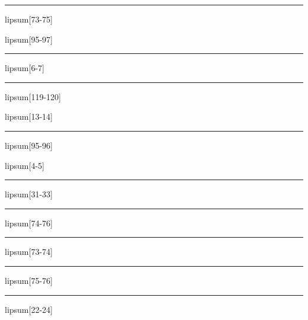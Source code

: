\documentclass[11pt,a4paper]{article}
\begin{document}
\begin{simplewrap}
  \textcolor{purple!26}{\rule{3.5cm}{6.7cm}}
\end{simplewrap}
lipsum[73-75]

lipsum[95-97]

\begin{simplewrap}
  \textcolor{cyan!35}{\rule{5.6cm}{9.6cm}}
\end{simplewrap}
lipsum[6-7]

\begin{simplewrap}
  \textcolor{magenta!51}{\rule{4.8cm}{3.8cm}}
\end{simplewrap}
lipsum[119-120]

lipsum[13-14]

\begin{simplewrap}
  \textcolor{pink!49}{\rule{4.3cm}{4.1cm}}
\end{simplewrap}
lipsum[95-96]

lipsum[4-5]

\begin{simplewrap}
  \textcolor{cyan!37}{\rule{5.3cm}{9.4cm}}
\end{simplewrap}
lipsum[31-33]

\begin{simplewrap}
  \textcolor{yellow!22}{\rule{5.8cm}{8.5cm}}
\end{simplewrap}
lipsum[74-76]

\begin{simplewrap}
  \textcolor{pink!18}{\rule{4.3cm}{3.7cm}}
\end{simplewrap}
lipsum[73-74]

\begin{simplewrap}
  \textcolor{yellow!36}{\rule{3.5cm}{8.3cm}}
\end{simplewrap}
lipsum[75-76]

\begin{simplewrap}
  \textcolor{magenta!49}{\rule{4.4cm}{4.0cm}}
\end{simplewrap}
lipsum[22-24]
\end{document}
